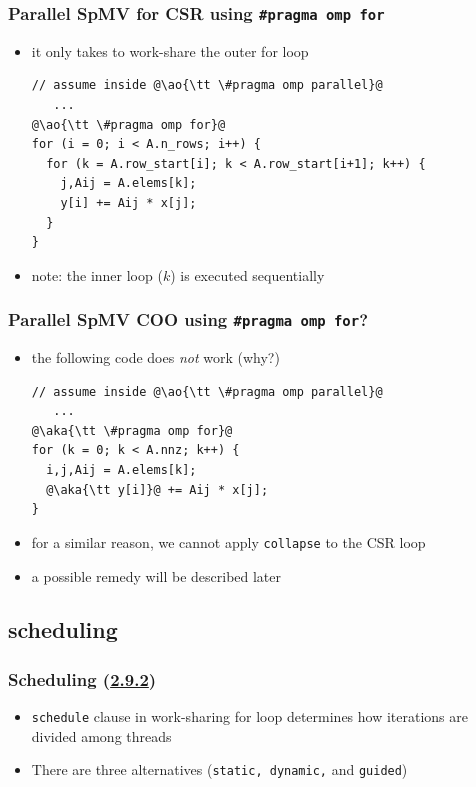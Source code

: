 \documentclass[12pt,dvipdfmx]{beamer}
\newcommand{\sectionompfor}{{\href{https://www.openmp.org/spec-html/5.0/openmpsu41.html\#x64-1290002.9.2}{2.9.2}}}
\newcommand{\ao}[1]{{\color{blue}#1}}
\newcommand{\aka}[1]{{\color{red}#1}}
\begin{document}
\begin{frame}[fragile]
\frametitle{Parallel SpMV for CSR using {\tt \#pragma omp for}}
\begin{itemize}
\item it only takes to work-share the outer for loop
\begin{lstlisting}
// assume inside @\ao{\tt \#pragma omp parallel}@
   ...
@\ao{\tt \#pragma omp for}@
for (i = 0; i < A.n_rows; i++) {
  for (k = A.row_start[i]; k < A.row_start[i+1]; k++) {
    j,Aij = A.elems[k];
    y[i] += Aij * x[j];
  }
}
\end{lstlisting}

\item note: the inner loop ($k$) is executed sequentially
\end{itemize}
\end{frame}


\begin{frame}[fragile]
  \frametitle{Parallel SpMV COO using {\tt \#pragma omp for}?}
  \begin{itemize}
  \item the following code does {\it not} work (why?)
\begin{lstlisting}
// assume inside @\ao{\tt \#pragma omp parallel}@
   ...
@\aka{\tt \#pragma omp for}@
for (k = 0; k < A.nnz; k++) {
  i,j,Aij = A.elems[k];
  @\aka{\tt y[i]}@ += Aij * x[j];
}
\end{lstlisting}
\item for a similar reason, we cannot apply \ao{\tt collapse} to the
  CSR loop 

\item a possible remedy will be described later
  \end{itemize}
\end{frame}

\subsection{scheduling}

\begin{frame}[fragile]
\frametitle{Scheduling (\sectionompfor)}
\begin{itemize}
\item \ao{\tt schedule} clause in work-sharing for loop determines
how iterations are divided among threads
\item There are three alternatives 
  (\ao{\tt static, dynamic,} and \ao{\tt guided})
\end{itemize}
\end{frame}
\end{document}
